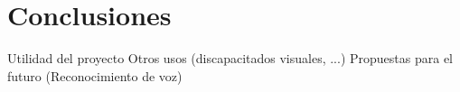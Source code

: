 \chapter{Conclusiones}
\label{chap:conclusiones}

     Utilidad del proyecto
     Otros usos (discapacitados visuales, ...)
     Propuestas para el futuro (Reconocimiento de voz)

